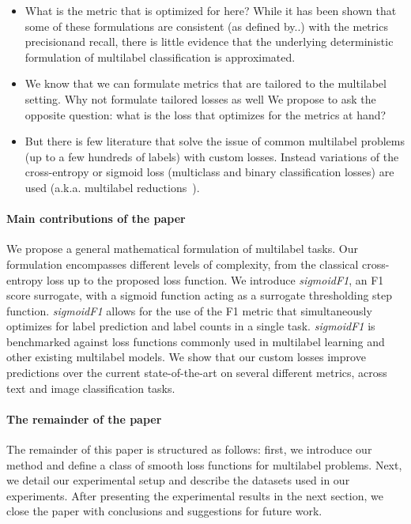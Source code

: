 \begin{itemize}
\item{What is the metric that is optimized for here? While it has been shown that some of these formulations are consistent (as defined by..) with the metrics precision\@K and recall\@K, there is little evidence that the underlying deterministic formulation of multilabel classification is approximated.}
\item{We know that we can formulate metrics that are tailored to the multilabel setting. Why not formulate tailored losses as well
We propose to ask the opposite question: what is the loss that optimizes for the metrics at hand?}
\item{But there is few literature that solve the issue of common multilabel problems (up to a few hundreds of labels) with custom losses. Instead variations of the cross-entropy or sigmoid loss (multiclass and binary classification losses) are used (a.k.a. multilabel reductions~\cite{multilabelReduction}).}
\end{itemize}


\paragraph{Main contributions of the paper}
We propose a general mathematical formulation of multilabel tasks.
Our formulation encompasses different levels of complexity, from the classical cross-entropy loss up to the proposed loss function. We introduce \emph{sigmoidF1}, an F1 score surrogate, with a sigmoid function acting as a surrogate thresholding step function.
\emph{sigmoidF1} allows for the use of the F1 metric that simultaneously optimizes for label prediction and label counts in a single task.
\emph{sigmoidF1} is benchmarked against loss functions commonly used in multilabel learning and other existing multilabel models. We show that our custom losses improve predictions over the current state-of-the-art on several different metrics, across text and image classification tasks.

\paragraph{The remainder of the paper}
The remainder of this paper is structured as follows: first,  we introduce our method and define a class of smooth loss functions for multilabel problems. Next, we detail our experimental setup and describe the datasets used in our experiments. After presenting the experimental results in the next section, we close the paper with conclusions and suggestions for future work.





